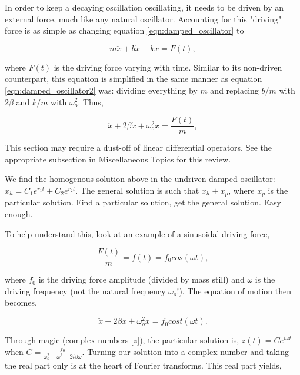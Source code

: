 {\exbegin}

In order to keep a decaying oscillation oscillating, it needs to be driven by an external force, much like any natural oscillator. Accounting for this "driving" force is as simple as changing equation \ref{eqn:damped_oscillator} to

\begin{equation*}
    m\ddot{x} + b\dot{x} + kx = F(t),
\end{equation*}

\noindent where $F(t)$ is the driving force varying with time. Similar to its non-driven counterpart, this equation is simplified in the same manner as equation \ref{eqn:damped_oscillator2} was: dividing everything by $m$ and replacing $b/m$ with $2\beta$ and $k/m$ with $\omega_o^2$. Thus,

\begin{equation*}
    \ddot{x} + 2\beta \dot{x} + \omega_o^2 x = \frac{F(t)}{m},
\end{equation*}

This section may require a dust-off of linear differential operators. See the appropriate subsection in Miscellaneous Topics for this review.

We find the homogenous solution above in the undriven damped oscillator: $x_h = C_1e^{r_1t} + C_2e^{r_2t}$. The general solution is such that $x_h + x_p$, where $x_p$ is the particular solution. Find a particular solution, get the general solution. Easy enough.

To help understand this, look at an example of a sinusoidal driving force,

\begin{equation*}
    \frac{F(t)}{m} = f(t) = f_0 cos(\omega t),
\end{equation*}

\noindent where $f_0$ is the driving force amplitude (divided by mass still) and $\omega$ is the driving frequency (not the natural frequency $\omega_o$!). The equation of motion then becomes,

\begin{equation*}
    \ddot{x} + 2\beta \dot{x} + \omega_o^2 x = f_0 cost(\omega t).
\end{equation*}

Through magic (complex numbers [$z$]), the particular solution is, $z(t) = Ce^{i \omega t}$ when $C = \frac{f_0}{\omega_o^2 - \omega^2 + 2i\beta \omega}$. Turning our solution into a complex number and taking the real part only is at the heart of Fourier transforms. This real part yields,


